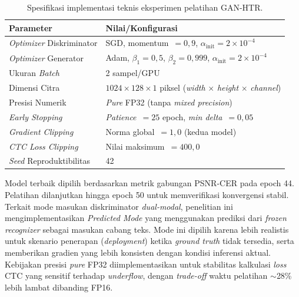 \documentclass[12pt,a4paper]{article}
\begin{document}
\begin{table}[!htbp]
  \caption[Spesifikasi implementasi teknis pelatihan]{Spesifikasi implementasi teknis eksperimen pelatihan GAN-HTR.}
  \label{tab:spesifikasi-implementasi}
  \small

  \renewcommand{\arraystretch}{1.2}
  \begin{tabular}{|l|p{8.5cm}|}
    \hline
    \textbf{Parameter}                        & \textbf{Nilai/Konfigurasi}                                                                         \\
    \hline
    \textit{Optimizer} Diskriminator          & SGD, momentum~$=0,9$, $\alpha_{\text{init}}=2\times10^{-4}$                                        \\
    \hline
    \textit{Optimizer} Generator              & Adam, $\beta_1=0,5$, $\beta_2=0,999$, $\alpha_{\text{init}}=2\times10^{-4}$                         \\
    \hline
    Ukuran \textit{Batch}                     & 2 sampel/GPU                                                                 \\
    \hline
    Dimensi Citra                             & $1024 \times 128 \times 1$ piksel (\textit{width} $\times$ \textit{height} $\times$ \textit{channel}) \\
    \hline
    Presisi Numerik                           & \textit{Pure} FP32 (tanpa \textit{mixed precision})                                                \\
    \hline
    \textit{Early Stopping}                   & \textit{Patience}~$=25$ epoch, \textit{min delta}~$=0,05$                                          \\
    \hline
    \textit{Gradient Clipping}                & Norma global~$=1,0$ (kedua model)                                                                  \\
    \hline
    \textit{CTC Loss Clipping}                & Nilai maksimum~$=400,0$                                                                            \\
    \hline
    \textit{Seed} Reproduktibilitas           & 42                                                                                                  \\
    \hline
  \end{tabular}
\end{table}

Model terbaik dipilih berdasarkan metrik gabungan PSNR-CER pada epoch 44. Pelatihan dilanjutkan hingga epoch 50 untuk memverifikasi konvergensi stabil. Terkait mode masukan diskriminator \textit{dual-modal}, penelitian ini mengimplementasikan \textit{Predicted Mode} yang menggunakan prediksi dari \textit{frozen recognizer} sebagai masukan cabang teks. Mode ini dipilih karena lebih realistis untuk skenario penerapan (\textit{deployment}) ketika \textit{ground truth} tidak tersedia, serta memberikan gradien yang lebih konsisten dengan kondisi inferensi aktual. Kebijakan presisi \textit{pure} FP32 diimplementasikan untuk stabilitas kalkulasi \textit{loss} CTC yang sensitif terhadap \textit{underflow}, dengan \textit{trade-off} waktu pelatihan $\sim$28\% lebih lambat dibanding FP16.
\end{document}
